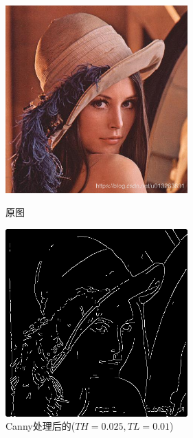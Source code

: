 \documentclass[11pt, a4paper, UTF8]{ctexart}
\begin{document}
\begin{figure}[H]
  \centering
  \begin{minipage}[t]{0.48\textwidth}
  \centering
  \includegraphics[width=7cm]{lena.png}
  \caption{原图}
  \end{minipage}
  \begin{minipage}[t]{0.48\textwidth}
  \centering
  \includegraphics[width=7cm]{Canny_TH=0.025_TL=0.01_lena.png}
  \caption{Canny处理后的($TH=0.025,TL=0.01$)}
  \end{minipage}
\end{figure}
\end{document}
